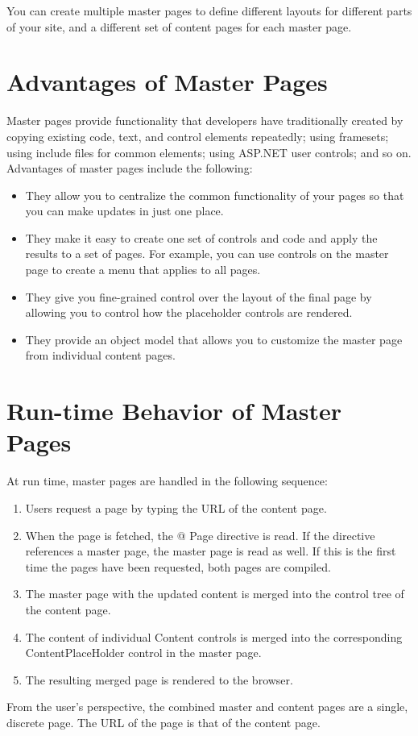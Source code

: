 You can create multiple master pages to define different layouts for different parts of your site, and a different set of content pages for each master page.

\section{Advantages of Master Pages}
Master pages provide functionality that developers have traditionally created by copying existing code, text, and control elements repeatedly; using framesets; using include files for common elements; using ASP.NET user controls; and so on. Advantages of master pages include the following:
\begin{itemize}
	\tightlist
	\item They allow you to centralize the common functionality of your pages so that you can make updates in just one place.	
	\item They make it easy to create one set of controls and code and apply the results to a set of pages. For example, you can use controls on the master page to create a menu that applies to all pages.	
	\item They give you fine-grained control over the layout of the final page by allowing you to control how the placeholder controls are rendered.	
	\item They provide an object model that allows you to customize the master page from individual content pages.
\end{itemize}

\section{Run-time Behavior of Master Pages}
At run time, master pages are handled in the following sequence:
\begin{enumerate}
	\tightlist
	\item Users request a page by typing the URL of the content page.	
	\item When the page is fetched, the @ Page directive is read. If the directive references a master page, the master page is read as well. If this is the first time the pages have been requested, both pages are compiled.	
	\item The master page with the updated content is merged into the control tree of the content page.	
	\item The content of individual Content controls is merged into the corresponding ContentPlaceHolder control in the master page.	
	\item The resulting merged page is rendered to the browser.
\end{enumerate}
From the user's perspective, the combined master and content pages are a single, discrete page. The URL of the page is that of the content page.

